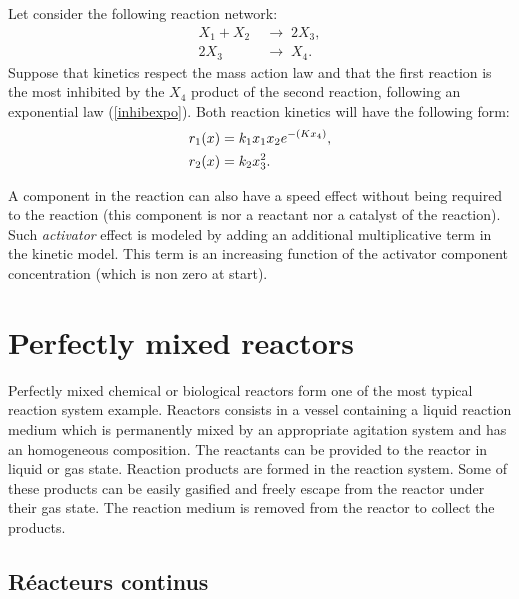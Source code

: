 \begin{exemple}  Let consider the following reaction network:
\begin{equation} \begin{split} \label{exa}
X_1 + X_2 \; &\longrightarrow \; 2X_3, \\ 
2X_3 \; &\longrightarrow \; X_4. 
\end{split} \end{equation}
Suppose that kinetics respect the mass action law and that the first reaction is the most inhibited by the $X_4$ product of the second reaction, 
following an exponential law (\ref{inhibexpo}).
Both reaction kinetics will have the following form:
\begin{equation} \begin{split} \label{cin}
r_1(x) &= k_1x_1x_2e^{-(Kx_4)}, \\
r_2(x) &= k_2x_3^2. \xqedhere{6.2cm}{\qed}
\end{split} \end{equation}
\end{exemple}

A component in the reaction can also have a speed effect without being required to the reaction
(this component is nor a reactant nor a catalyst of the reaction).
Such {\it activator} effect is modeled by adding an additional multiplicative term in the kinetic model.
This term is an increasing function of the activator component concentration (which is non zero at start).

\section{Perfectly mixed reactors}

Perfectly mixed chemical or biological reactors form one of the most typical reaction system example.
Reactors consists in a vessel containing a liquid reaction medium which is permanently mixed by an appropriate agitation system and has an homogeneous composition.
The reactants can be provided to the reactor in liquid or gas state.
Reaction products are formed in the reaction system.
Some of these products can be easily gasified
and freely escape from the reactor under their gas state.
The reaction medium is removed from the reactor to collect the products.


\subsection {Réacteurs continus}

